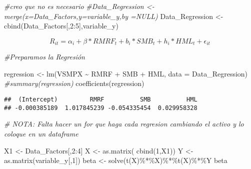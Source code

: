 \documentclass[
]{article}
\newenvironment{Shaded}{\begin{snugshade}}{\end{snugshade}}
\newcommand{\AttributeTok}[1]{\textcolor[rgb]{0.77,0.63,0.00}{#1}}
\newcommand{\CommentTok}[1]{\textcolor[rgb]{0.56,0.35,0.01}{\textit{#1}}}
\newcommand{\DecValTok}[1]{\textcolor[rgb]{0.00,0.00,0.81}{#1}}
\newcommand{\FunctionTok}[1]{\textcolor[rgb]{0.00,0.00,0.00}{#1}}
\newcommand{\NormalTok}[1]{#1}
\newcommand{\OtherTok}[1]{\textcolor[rgb]{0.56,0.35,0.01}{#1}}
\newcommand{\SpecialCharTok}[1]{\textcolor[rgb]{0.00,0.00,0.00}{#1}}
\begin{document}
\begin{Shaded}
\begin{Highlighting}[]
\CommentTok{\#creo que no es necesario}
\CommentTok{\#Data\_Regression \textless{}{-} merge(x=Data\_Factors,y=variable\_y,by =NULL)}
\NormalTok{Data\_Regression }\OtherTok{\textless{}{-}} \FunctionTok{cbind}\NormalTok{(Data\_Factors[,}\DecValTok{2}\SpecialCharTok{:}\DecValTok{5}\NormalTok{],variable\_y)}
\end{Highlighting}
\end{Shaded}

\[
R_{it}=\alpha_i+\beta \ast RMRF_t +b_i \ast SMB_t +h_i \ast HML_t + \epsilon_{it}
\]

\begin{Shaded}
\begin{Highlighting}[]
\CommentTok{\#Preparamos la Regresión}


\NormalTok{regression }\OtherTok{\textless{}{-}} \FunctionTok{lm}\NormalTok{(VSMPX }\SpecialCharTok{\textasciitilde{}}\NormalTok{ RMRF }\SpecialCharTok{+}\NormalTok{ SMB }\SpecialCharTok{+}\NormalTok{ HML, }\AttributeTok{data =}\NormalTok{ Data\_Regression)}
\CommentTok{\#summary(regression)}
\FunctionTok{coefficients}\NormalTok{(regression)}
\end{Highlighting}
\end{Shaded}

\begin{verbatim}
##  (Intercept)         RMRF          SMB          HML 
## -0.000385189  1.017845239 -0.054335454  0.029958328
\end{verbatim}

\begin{Shaded}
\begin{Highlighting}[]
\CommentTok{\# NOTA: Falta hacer un for que haga cada regresion cambiando el activo y lo coloque en un dataframe}
\end{Highlighting}
\end{Shaded}

\begin{Shaded}
\begin{Highlighting}[]
\NormalTok{X1 }\OtherTok{\textless{}{-}}\NormalTok{ Data\_Factors[,}\DecValTok{2}\SpecialCharTok{:}\DecValTok{4}\NormalTok{]}
\NormalTok{X }\OtherTok{\textless{}{-}} \FunctionTok{as.matrix}\NormalTok{( }\FunctionTok{cbind}\NormalTok{(}\DecValTok{1}\NormalTok{,X1))}
\NormalTok{Y }\OtherTok{\textless{}{-}} \FunctionTok{as.matrix}\NormalTok{(variable\_y[,}\DecValTok{1}\NormalTok{])}
\NormalTok{beta }\OtherTok{\textless{}{-}} \FunctionTok{solve}\NormalTok{(}\FunctionTok{t}\NormalTok{(X)}\SpecialCharTok{\%*\%}\NormalTok{X)}\SpecialCharTok{\%*\%}\FunctionTok{t}\NormalTok{(X)}\SpecialCharTok{\%*\%}\NormalTok{Y}
\NormalTok{beta}
\end{Highlighting}
\end{Shaded}
\end{document}
